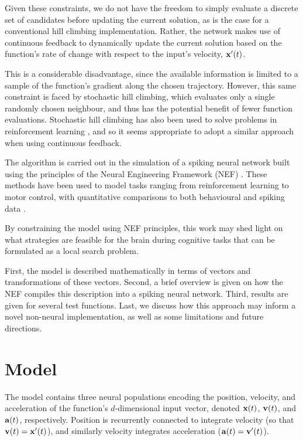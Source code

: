 \documentclass[letterpaper, 10 pt, conference]{ieeeconf}  %
\newcommand{\bolds}[1]{{\bf #1}}
\begin{document}
Given these constraints, we do not have the freedom to simply evaluate a discrete set of candidates before updating the current solution, as is the case for a conventional hill climbing implementation. Rather, the network makes use of continuous feedback to dynamically update the current solution based on the function's rate of change with respect to the input's velocity, $\bolds{x}'(t)$. 

This is a considerable disadvantage, since the available information is limited to a sample of the function's gradient along the chosen trajectory. However, this same constraint is faced by stochastic hill climbing, which evaluates only a single randomly chosen neighbour, and thus has the potential benefit of fewer function evaluations. Stochastic hill climbing has also been used to solve problems in reinforcement learning \cite{kimura1995reinforcement}, and so it seems appropriate to adopt a similar approach when using continuous feedback.

The algorithm is carried out in the simulation of a spiking neural network built using the principles of the Neural Engineering Framework (NEF) \cite{eliasmith2003neural}. These methods have been used to model tasks ranging from reinforcement learning to motor control, with quantitative comparisons to both behavioural and spiking data \cite{Rasmussen2014b, dewolf2011, eliasmith2012}.

By constraining the model using NEF principles, this work may shed light on what strategies are feasible for the brain during cognitive tasks that can be formulated as a local search problem.


First, the model is described mathematically in terms of vectors and transformations of these vectors. Second, a brief overview is given on how the NEF compiles this description into a spiking neural network. Third, results are given for several test functions. Last, we discuss how this approach may inform a novel non-neural implementation, as well as some limitations and future directions.

\section{Model} \label{sec-model}

The model contains three neural populations encoding the position, velocity, and acceleration of the function's $d$-dimensional input vector, denoted $\bolds{x}(t)$, $\bolds{v}(t)$, and $\bolds{a}(t)$, respectively. Position is recurrently connected to integrate velocity (so that $\bolds{v}(t) = \bolds{x}'(t)$), and similarly velocity integrates acceleration ($\bolds{a}(t) = \bolds{v}'(t)$). 
\end{document}

